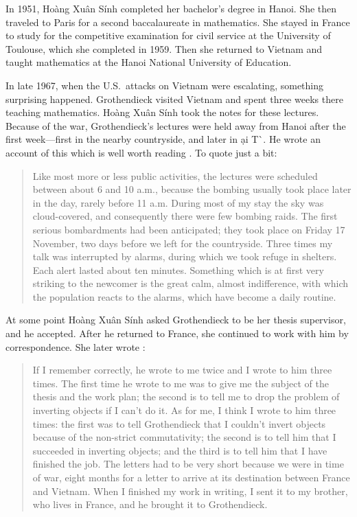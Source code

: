 \documentclass[reqno,12pt]{amsart}
\theoremstyle{definition}
\begin{document}
In 1951, Ho\`ang Xu\^an S\'inh completed her bachelor's degree in Hanoi.  She then traveled to Paris for a second baccalaureate in mathematics.  She stayed in France to study for the competitive examination for civil service at the University of Toulouse, which she completed in 1959.  Then she returned to Vietnam and taught mathematics at the Hanoi National University of Education.

In late 1967, when the U.S.\ attacks on Vietnam were escalating, something surprising happened.  Grothendieck visited Vietnam and spent three weeks there teaching mathematics. Ho\`ang Xu\^an S\'inh took the notes for these lectures.  Because of the war, Grothendieck's lectures were held away from Hanoi after the first week---first in the nearby countryside, and later in \DJ\d ai {T\`\uhorn \selectfont }.   He wrote an account of this which is well worth reading \cite{G67}.  To quote just a bit:
\begin{quote}
Like most more or less public activities, the lectures were scheduled between about
6 and 10 a.m., because the bombing usually took place later in the day, rarely before 11
a.m. During most of my stay the sky was cloud-covered, and consequently there were few
bombing raids. The first serious bombardments had been anticipated; they took place on
Friday 17 November, two days before we left for the countryside. Three times my talk was
interrupted by alarms, during which we took refuge in shelters. Each alert lasted about
ten minutes. Something which is at first very striking to the newcomer is the great calm,
almost indifference, with which the population reacts to the alarms, which have become a
daily routine. 
\end{quote}

At some point Ho\`ang Xu\^an S\'inh asked Grothendieck to be her thesis supervisor, and he accepted.  After he returned to France, she continued to work with him by correspondence.   She later wrote \cite{H23}:

\begin{quote}
If I remember correctly, he wrote to me twice and I wrote to him three times. The first time he wrote to me was to give me the subject of the thesis and the work plan; the second is to tell me to drop the problem of inverting objects if I can't do it. As for me, I think I wrote to him three times: the first was to tell Grothendieck that I couldn't invert objects because of the non-strict commutativity; the second is to tell him that I succeeded in inverting objects; and the third is to tell him that I have finished the job. The letters had to be very short because we were in time of war, eight months for a letter to arrive at its destination between France and Vietnam. When I finished my work in writing, I sent it to my brother, who lives in France, and he brought it to Grothendieck.
\end{quote}
\end{document}
